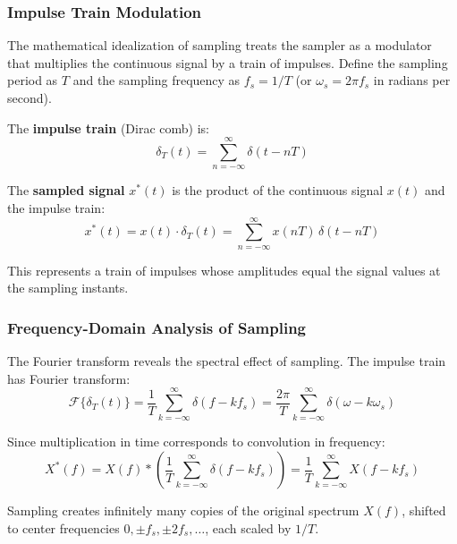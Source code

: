 \subsubsection{Impulse Train Modulation}

The mathematical idealization of sampling treats the sampler as a modulator that multiplies the continuous signal by a train of impulses. Define the sampling period as $T$ and the sampling frequency as $f_s = 1/T$ (or $\omega_s = 2\pi f_s$ in radians per second).

The \textbf{impulse train} (Dirac comb) is:
\begin{equation}
\delta_T(t) = \sum_{n=-\infty}^{\infty} \delta(t - nT)
\label{eq:impulse_train}
\end{equation}

The \textbf{sampled signal} $x^*(t)$ is the product of the continuous signal $x(t)$ and the impulse train:
\begin{equation}
x^*(t) = x(t) \cdot \delta_T(t) = \sum_{n=-\infty}^{\infty} x(nT) \, \delta(t - nT)
\label{eq:sampled_signal}
\end{equation}

This represents a train of impulses whose amplitudes equal the signal values at the sampling instants.

\subsubsection{Frequency-Domain Analysis of Sampling}

The Fourier transform reveals the spectral effect of sampling. The impulse train has Fourier transform:
\begin{equation}
\mathcal{F}\{\delta_T(t)\} = \frac{1}{T} \sum_{k=-\infty}^{\infty} \delta(f - k f_s) = \frac{2\pi}{T} \sum_{k=-\infty}^{\infty} \delta(\omega - k\omega_s)
\label{eq:impulse_train_spectrum}
\end{equation}

Since multiplication in time corresponds to convolution in frequency:
\begin{equation}
X^*(f) = X(f) * \left( \frac{1}{T} \sum_{k=-\infty}^{\infty} \delta(f - k f_s) \right) = \frac{1}{T} \sum_{k=-\infty}^{\infty} X(f - k f_s)
\label{eq:sampled_spectrum}
\end{equation}

\begin{tcolorbox}[colback=green!5!white,colframe=green!75!black,sharp corners,title=Spectral Effect of Sampling]
Sampling creates infinitely many copies of the original spectrum $X(f)$, shifted to center frequencies $0, \pm f_s, \pm 2f_s, \ldots$, each scaled by $1/T$.
\end{tcolorbox}

